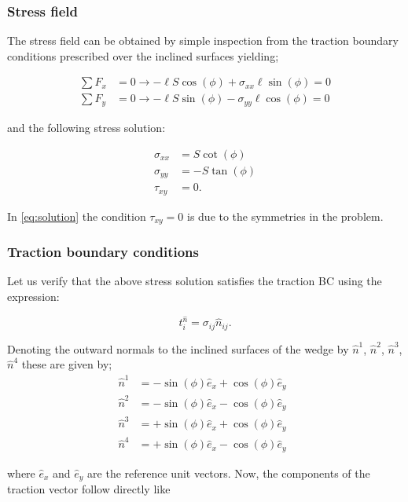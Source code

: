 \subsubsection*{Stress field}

The stress field can be obtained by simple inspection from the traction boundary conditions prescribed over the inclined surfaces yielding;

\begin{align*}
\sum F_x &= 0 \longrightarrow - \ell S\cos(\phi)  + \sigma_{xx}\ell \sin(\phi) = 0\\
\sum F_y &= 0 \longrightarrow - \ell S\sin(\phi) - \sigma_{yy}\ell \cos(\phi)=0
\end{align*}

and the following stress solution:

\begin{equation}
\begin{aligned}
\sigma_{xx}& = S \cot(\phi)\\
\sigma_{yy}& = -S\tan(\phi)\\
\tau_{xy}& = 0.
\end{aligned}
\label{eq:solution}
\end{equation}

In \cref{eq:solution} the condition $\tau_{xy}=0$ is due to the symmetries in the problem.

\subsubsection*{Traction boundary conditions}
Let us verify that the above stress solution satisfies the traction BC using the expression:

\[t_i^{\hat n} = \sigma _{ij} \hat n_{ij}.\]

Denoting the outward normals to the inclined surfaces of the wedge by $\hat{n}^1$,  $\hat{n}^2$, $\hat{n}^3$, $\hat{n}^4$ these are given by;
\begin{align*}
\hat{n}^1 &= -\sin(\phi)\hat{e}_{x}+\cos(\phi)\hat{e}_{y}\\
\hat{n}^2 &= -\sin(\phi)\hat{e}_{x}-\cos(\phi)\hat{e}_{y}\\
\hat{n}^3 &= +\sin(\phi)\hat{e}_{x}+\cos(\phi)\hat{e}_{y}\\
\hat{n}^4 &= +\sin(\phi)\hat{e}_{x}-\cos(\phi)\hat{e}_{y} \enspace
\end{align*}

where $\hat{e}_{x}$ and $\hat{e}_{y}$ are the reference unit vectors. Now, the components of the traction vector follow directly like

